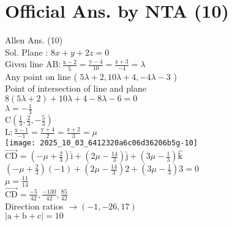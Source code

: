 \documentclass[10pt]{article}
\begin{document}
\section*{Official Ans. by NTA (10)}
Allen Ans. (10)\\
Sol. Plane : \(8 x+y+2 z=0\)\\
Given line \(\mathrm{AB}: \frac{\mathrm{x}-2}{5}=\frac{\mathrm{y}-4}{10}=\frac{\mathrm{z}+3}{-4}=\lambda\)\\
Any point on line ( \(5 \lambda+2,10 \lambda+4,-4 \lambda-3\) )\\
Point of intersection of line and plane\\
\(8(5 \lambda+2)+10 \lambda+4-8 \lambda-6=0\)\\
\(\lambda=-\frac{1}{3}\)\\
\(\mathrm{C}\left(\frac{1}{3}, \frac{2}{3},-\frac{5}{3}\right)\)\\
\(\mathrm{L}: \frac{\mathrm{x}-1}{-1}=\frac{\mathrm{y}+4}{2}=\frac{\mathrm{z}+2}{3}=\mu\)\\
\texttt{[image: 2025\_10\_03\_6412320a6c06d36206b5g-10]}\\
\(\overrightarrow{\mathrm{CD}}=\left(-\mu+\frac{2}{3}\right) \hat{\mathrm{i}}+\left(2 \mu-\frac{14}{3}\right) \hat{\mathrm{j}}+\left(3 \mu-\frac{1}{3}\right) \hat{\mathrm{k}}\)\\
\(\left(-\mu+\frac{2}{3}\right)(-1)+\left(2 \mu-\frac{14}{3}\right) 2+\left(3 \mu-\frac{1}{3}\right) 3=0\)\\
\(\mu=\frac{11}{14}\)\\
\(\overrightarrow{\mathrm{CD}}=\frac{-5}{42}, \frac{-130}{42}, \frac{85}{42}\)\\
Direction ratios \(\rightarrow(-1,-26,17)\)\\
\(|\mathrm{a}+\mathrm{b}+\mathrm{c}|=10\)
\end{document}
